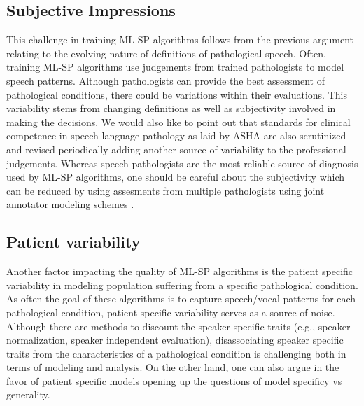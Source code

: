 \documentclass{article}
\begin{document}
\subsection{Subjective Impressions}
This challenge in training ML-SP algorithms follows from the previous argument relating to the evolving nature of definitions of pathological speech.
Often, training ML-SP algorithms use judgements from trained pathologists \cite{} to model speech patterns.
Although pathologists can provide the best assessment of pathological conditions, there could be variations within their evaluations. 
This variability stems from changing definitions as well as subjectivity involved in making the decisions.
We would also like to point out that standards for clinical competence in speech-language pathology \cite{} as laid by ASHA are also scrutinized and revised periodically adding another source of variability to the professional judgements.    
Whereas speech pathologists are the most reliable source of diagnosis used by ML-SP algorithms, one should be careful about the subjectivity which can be reduced by using assesments from multiple pathologists using joint annotator modeling schemes \cite{}. 

\subsection{Patient variability}
Another factor impacting the quality of ML-SP algorithms is the patient specific variability in modeling population suffering from a specific pathological condition. 
As often the goal of these algorithms is to capture speech/vocal patterns for each pathological condition, patient specific variability serves as a source of noise.
Although there are methods to discount the speaker specific traits (e.g., speaker normalization, speaker independent evaluation), disassociating speaker specific traits from the characteristics of a pathological condition is challenging both in terms of modeling and analysis. 
On the other hand, one can also argue in the favor of patient specific models opening up the questions of model specificy vs generality. 
\end{document}
